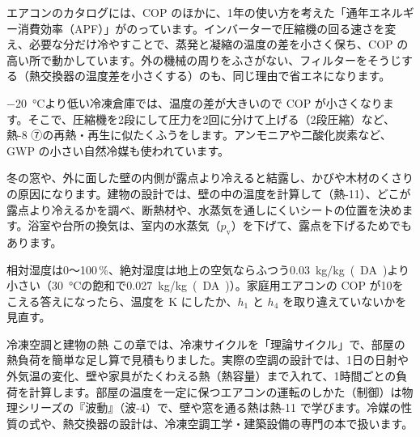 \begin{phkougaku}
エアコンのカタログには、COP のほかに、1年の使い方を考えた「通年エネルギー消費効率（APF）」がのっています。インバーターで圧縮機の回る速さを変え、必要な分だけ冷やすことで、蒸発と凝縮の温度の差を小さく保ち、COP の高い所で動かしています。外の機械の周りをふさがない、フィルターをそうじする（熱交換器の温度差を小さくする）のも、同じ理由で省エネになります。

\qty{-20}{\celsius}より低い冷凍倉庫では、温度の差が大きいので COP が小さくなります。そこで、圧縮機を2段にして圧力を2回に分けて上げる（2段圧縮）など、熱-8 ⑦の再熱・再生に似たくふうをします。アンモニアや二酸化炭素など、GWP の小さい自然冷媒も使われています。

冬の窓や、外に面した壁の内側が露点より冷えると結露し、かびや木材のくさりの原因になります。建物の設計では、壁の中の温度を計算して（熱-11）、どこが露点より冷えるかを調べ、断熱材や、水蒸気を通しにくいシートの位置を決めます。浴室や台所の換気は、室内の水蒸気（$p_{\mathrm v}$）を下げて、露点を下げるためでもあります。
\begin{phketa}[冷房と湿り空気の数]
相対湿度は0〜100\,\%、絶対湿度は地上の空気ならふつう\qty{0.03}{kg/kg(DA)}より小さい（\qty{30}{\celsius}の飽和で\qty{0.027}{kg/kg(DA)}）。家庭用エアコンの COP が10をこえる答えになったら、温度を K にしたか、$h_1$ と $h_4$ を取り違えていないかを見直す。
\end{phketa}
\end{phkougaku}

\begin{phsaki}{冷凍空調と建物の熱}
この章では、冷凍サイクルを「理論サイクル」で、部屋の熱負荷を簡単な足し算で見積もりました。実際の空調の設計では、1日の日射や外気温の変化、壁や家具がたくわえる熱（熱容量）まで入れて、1時間ごとの負荷を計算します。部屋の温度を一定に保つエアコンの運転のしかた（制御）は物理シリーズの『波動』（波-4）で、壁や窓を通る熱は熱-11 で学びます。冷媒の性質の式や、熱交換器の設計は、冷凍空調工学・建築設備の専門の本で扱います。
\end{phsaki}

